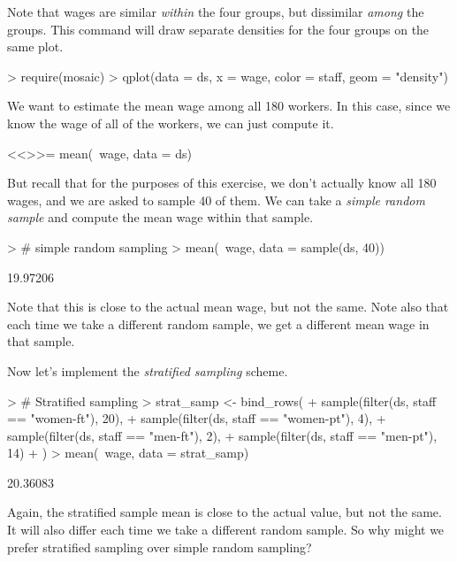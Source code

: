 \documentclass[10pt]{article}
\begin{document}
  Note that wages are similar \emph{within} the four groups, but dissimilar \emph{among} the groups. This command will draw separate densities for the four groups on the same plot. 

\begin{Schunk}
\begin{Sinput}
> require(mosaic)
> qplot(data = ds, x = wage, color = staff, geom = "density")
\end{Sinput}
\end{Schunk}

  We want to estimate the mean wage among all 180 workers. In this case, since we know the wage of all of the workers, we can just compute it. 
  
  <<>>=
mean(~wage, data = ds)
  
 But recall that for the purposes of this exercise, we don't actually know all 180 wages, and we are asked to sample 40 of them. We can take a \emph{simple random sample} and compute the mean wage within that sample.

\begin{Schunk}
\begin{Sinput}
> # simple random sampling
> mean(~wage, data = sample(ds, 40))
\end{Sinput}
\begin{Soutput}
[1] 19.97206
\end{Soutput}
\end{Schunk}

Note that this is close to the actual mean wage, but not the same. Note also that each time we take a different random sample, we get a different mean wage in that sample. 

  Now let's implement the \emph{stratified sampling} scheme.

\begin{Schunk}
\begin{Sinput}
> # Stratified sampling
> strat_samp <- bind_rows(
+   sample(filter(ds, staff == "women-ft"), 20), 
+   sample(filter(ds, staff == "women-pt"), 4), 
+   sample(filter(ds, staff == "men-ft"), 2), 
+   sample(filter(ds, staff == "men-pt"), 14)
+ )
> mean(~wage, data = strat_samp)
\end{Sinput}
\begin{Soutput}
[1] 20.36083
\end{Soutput}
\end{Schunk}

  Again, the stratified sample mean is close to the actual value, but not the same. It will also differ each time we take a different random sample. So why might we prefer stratified sampling over simple random sampling?
  
\end{document}

